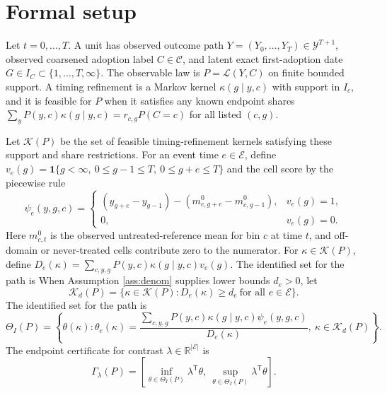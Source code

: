 \documentclass[11pt]{article}
\newcommand{\one}{\mathbf{1}}
\newcommand{\transpose}{\mathsf{T}}
\newcommand{\R}{\mathbb{R}}
\theoremstyle{definition}
\theoremstyle{plain}
\theoremstyle{remark}
\begin{document}
\section{Formal setup}
Let \(t=0,\ldots,T\). A unit has observed outcome path \(Y=(Y_0,\ldots,Y_T)\in\mathcal Y^{T+1}\), observed coarsened adoption label \(C\in\mathcal C\), and latent exact first-adoption date \(G\in I_C\subset\{1,\ldots,T,\infty\}\). The observable law is \(P=\mathcal L(Y,C)\) on finite bounded support. A timing refinement is a Markov kernel \(\kappa(g\mid y,c)\) with support in \(I_c\), and it is feasible for \(P\) when it satisfies any known endpoint shares \(\sum_y P(y,c)\kappa(g\mid y,c)=r_{c,g}P(C=c)\) for all listed \((c,g)\).

Let \(\mathcal K(P)\) be the set of feasible timing-refinement kernels satisfying these support and share restrictions. For an event time \(e\in\mathcal E\), define \(v_e(g)=\one\{g<\infty,\ 0\le g-1\le T,\ 0\le g+e\le T\}\) and the cell score by the piecewise rule
\[
\psi_e(y,g,c)=
\begin{cases}
(y_{g+e}-y_{g-1})-(m^0_{c,g+e}-m^0_{c,g-1}), & v_e(g)=1,\\
0, & v_e(g)=0.
\end{cases}
\]
Here \(m^0_{c,t}\) is the observed untreated-reference mean for bin \(c\) at time \(t\), and off-domain or never-treated cells contribute zero to the numerator. For \(\kappa\in\mathcal K(P)\), define \(D_e(\kappa)=\sum_{c,y,g}P(y,c)\kappa(g\mid y,c)v_e(g)\). The identified set for the path is
When Assumption \ref{ass:denom} supplies lower bounds \(d_e>0\), let
\[
\mathcal K_d(P)=\{\kappa\in\mathcal K(P):D_e(\kappa)\ge d_e\ \text{for all }e\in\mathcal E\}.
\]
The identified set for the path is
\[
\Theta_I(P)=\left\{\theta(\kappa):\theta_e(\kappa)=
\frac{\sum_{c,y,g}P(y,c)\kappa(g\mid y,c)\psi_e(y,g,c)}
{D_e(\kappa)} ,\ \kappa\in\mathcal K_d(P)\right\}.
\]
The endpoint certificate for contrast \(\lambda\in\R^{|\mathcal E|}\) is
\[
\Gamma_\lambda(P)=\left[\inf_{\theta\in\Theta_I(P)}\lambda^\transpose\theta,\ 
\sup_{\theta\in\Theta_I(P)}\lambda^\transpose\theta\right].
\]
\end{document}
